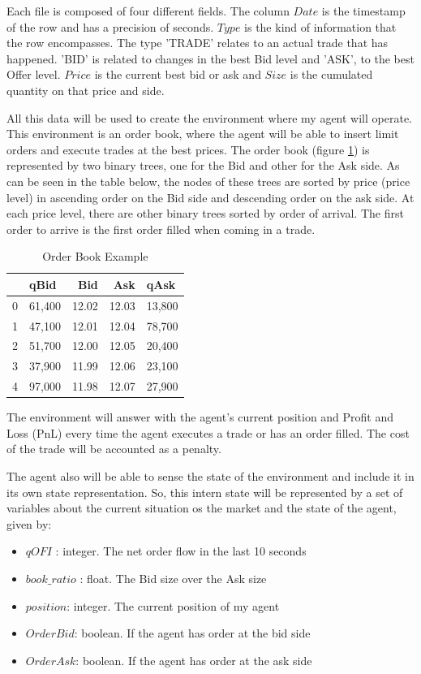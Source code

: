 \documentclass[a4paper]{article}
\begin{document}
Each file is composed of four different fields. The column $Date$ is the timestamp of the row and has a precision of seconds. $Type$ is the kind of information that the row encompasses. The type 'TRADE' relates to an actual trade that has happened. 'BID' is related to changes in the best Bid level and 'ASK', to the best Offer level. $Price$ is the current best bid or ask and $Size$ is the cumulated quantity on that price and side.

All this data will be used to create the environment where my agent will operate. This environment is an order book, where the agent will be able to insert limit orders and execute trades at the best prices. The order book (figure \ref{tab:order_book}) is represented by two binary trees, one for the Bid and other for the Ask side. As can be seen in the table below, the nodes of these trees are sorted by price (price level) in ascending order on the Bid side and descending order on the ask side. At each price level, there are other binary trees sorted by order of arrival. The first order to arrive is the first order filled when coming in a trade.

\begin{table}[ht!]
\centering
\begin{tabular}{l|lrrl}
{} &    qBid &    Bid &    Ask &    qAsk \\
\midrule
0 &  61,400 &  12.02 &  12.03 &  13,800 \\
1 &  47,100 &  12.01 &  12.04 &  78,700 \\
2 &  51,700 &  12.00 &  12.05 &  20,400 \\
3 &  37,900 &  11.99 &  12.06 &  23,100 \\
4 &  97,000 &  11.98 &  12.07 &  27,900 \\

\end{tabular}
\caption{\label{tab:order_book}Order Book Example}
\end{table}

The environment will answer with the agent's current position and Profit and Loss (PnL) every time the agent executes a trade or has an order filled. The cost of the trade will be accounted as a penalty.

The agent also will be able to sense the state of the environment and include it in its own state representation. So, this intern state will be represented by a set of variables about the current situation os the market and the state of the agent, given by:

\begin{itemize}
\item $qOFI$ : integer. The net order flow in the last 10 seconds
\item $book\_ratio$ : float. The Bid size over the Ask size
\item $position$: integer. The current position of my agent
\item $OrderBid$: boolean. If the agent has order at the bid side
\item $OrderAsk$: boolean. If the agent has order at the ask side
\end{itemize}
\end{document}
